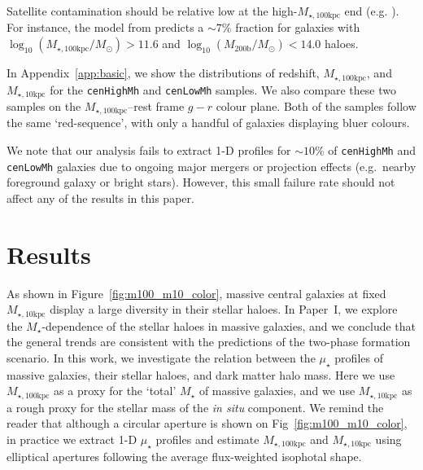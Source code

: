 \documentclass[a4paper,fleqn,usenatbib]{mnras}
\def\rbcg{\texttt{cenHighMh}}
\def\nbcg{\texttt{cenLowMh}}
\def\mstar{{$M_{\star}$}}
\def\logmh{{$\log_{10} (M_{\mathrm{200b}}/M_{\odot})$}}
\def\minn{{$M_{\star,10\mathrm{kpc}}$}}
\def\mtot{{$M_{\star,100\mathrm{kpc}}$}}
\def\logmtot{{$\log_{10} (M_{\star,100\mathrm{kpc}}/M_{\odot})$}}
\def\mden{{$\mu_{\star}$}}
\begin{document}
    Satellite contamination should be relative low at the high-\mtot{} end
    (e.g. \citealt{Reid2014, Hoshino2015, Saito2016, vanUitert2016}). 
    For instance, the model from \citet{Saito2016} predicts a $\sim 7$\% 
    fraction for galaxies with \logmtot{}$>11.6$ and \logmh$<14.0$ haloes.
    
    In Appendix~\ref{app:basic}, we show the distributions of redshift, \mtot{}, and 
    \minn{} for the \rbcg{} and \nbcg{} samples. 
    We also compare these two samples on the \mtot{}--rest frame $g-r$ colour plane. 
    Both of the samples follow the same `red-sequence', with only a handful of galaxies 
    displaying bluer colours.
    
    We note that our analysis fails to extract 1-D profiles for $\sim10$\% of 
    \rbcg{} and \nbcg{} galaxies due to ongoing major mergers or projection effects 
    (e.g.\ nearby foreground galaxy or bright stars). 
    However, this small failure rate should not affect any of the results in this paper.
    

\section{Results}
    \label{sec:result}
    
    As shown in Figure~\ref{fig:m100_m10_color}, massive central galaxies at fixed  
    \minn{} display a large diversity in their stellar haloes. 
    In Paper~I, we explore the \mstar{}-dependence of the stellar haloes in massive 
    galaxies, and we conclude that the general trends are consistent with the 
    predictions of the two-phase formation scenario. 
    In this work, we investigate the relation between the \mden{} profiles of 
    massive galaxies, their stellar haloes, and dark matter halo mass. 
    Here we use \mtot{} as a proxy for the `total' \mstar{} of massive galaxies, and 
    we use \minn{} as a rough proxy for the stellar mass of the \textit{in situ} 
    component.  
    We remind the reader that although a circular aperture is shown on 
    Fig~\ref{fig:m100_m10_color}, in practice we extract 1-D \mden{} profiles and 
    estimate \mtot{} and \minn{} using elliptical apertures following the average 
    flux-weighted isophotal shape. 
\end{document}
